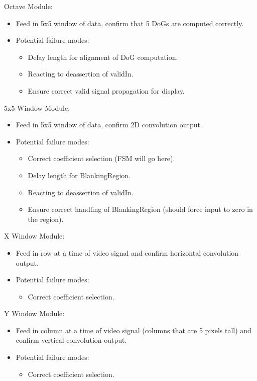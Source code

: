\documentclass[11pt]{article}
\begin{document}
Octave Module:
\begin{itemize}
    \item Feed in 5x5 window of data, confirm that 5 DoGs are computed correctly.
    \item Potential failure modes:
        \begin{itemize}
            \item Delay length for alignment of DoG computation.
            \item Reacting to deassertion of validIn.
            \item Ensure correct valid signal propagation for display.
        \end{itemize}
\end{itemize}


5x5 Window Module:
\begin{itemize}
    \item Feed in 5x5 window of data, confirm 2D convolution output.
    \item Potential failure modes:
        \begin{itemize}
            \item Correct coefficient selection (FSM will go here).
            \item Delay length for BlankingRegion.
            \item Reacting to deassertion of validIn.
            \item Ensure correct handling of BlankingRegion (should force input to zero in the region).
        \end{itemize}
\end{itemize}


X Window Module:
\begin{itemize}
    \item Feed in row at a time of video signal and confirm horizontal convolution output.
    \item Potential failure modes:
        \begin{itemize}
            \item Correct coefficient selection.
        \end{itemize}
\end{itemize}


Y Window Module:
\begin{itemize}
    \item Feed in column at a time of video signal (columns that are 5 pixels tall) and confirm vertical convolution output.
    \item Potential failure modes:
        \begin{itemize}
            \item Correct coefficient selection.
        \end{itemize}
\end{itemize}
\end{document}

